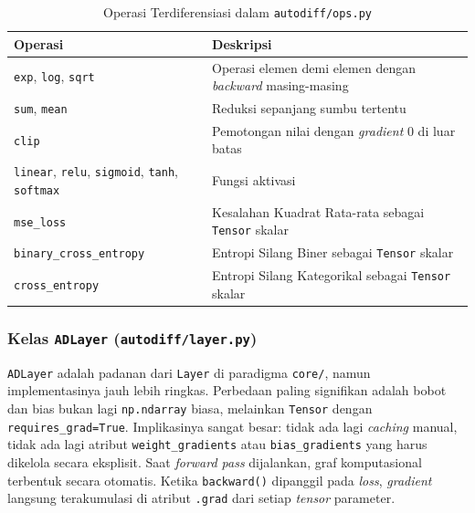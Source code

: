 \begin{table}[H]
    \centering
    \caption{Operasi Terdiferensiasi dalam \texttt{autodiff/ops.py}}
    \begin{tabular}{ll}
        \toprule
        \textbf{Operasi} & \textbf{Deskripsi} \\
        \midrule
        \texttt{exp}, \texttt{log}, \texttt{sqrt} & Operasi elemen demi elemen dengan \textit{backward} masing-masing \\
        \texttt{sum}, \texttt{mean} & Reduksi sepanjang sumbu tertentu \\
        \texttt{clip} & Pemotongan nilai dengan \textit{gradient} 0 di luar batas \\
        \texttt{linear}, \texttt{relu}, \texttt{sigmoid}, \texttt{tanh}, \texttt{softmax} & Fungsi aktivasi \\
        \texttt{mse\_loss} & Kesalahan Kuadrat Rata-rata sebagai \texttt{Tensor} skalar \\
        \texttt{binary\_cross\_entropy} & Entropi Silang Biner sebagai \texttt{Tensor} skalar \\
        \texttt{cross\_entropy} & Entropi Silang Kategorikal sebagai \texttt{Tensor} skalar \\
        \bottomrule
    \end{tabular}
    \label{tab:ops}
\end{table}

\subsubsection{Kelas \texttt{ADLayer} (\texttt{autodiff/layer.py})}

\texttt{ADLayer} adalah padanan dari \texttt{Layer} di paradigma \texttt{core/}, namun implementasinya jauh lebih ringkas. Perbedaan paling signifikan adalah bobot dan bias bukan lagi \texttt{np.ndarray} biasa, melainkan \texttt{Tensor} dengan \texttt{requires\_grad=True}. Implikasinya sangat besar: tidak ada lagi \textit{caching} manual, tidak ada lagi atribut \texttt{weight\_gradients} atau \texttt{bias\_gradients} yang harus dikelola secara eksplisit. Saat \textit{forward pass} dijalankan, graf komputasional terbentuk secara otomatis. Ketika \texttt{backward()} dipanggil pada \textit{loss}, \textit{gradient} langsung terakumulasi di atribut \texttt{.grad} dari setiap \textit{tensor} parameter.

